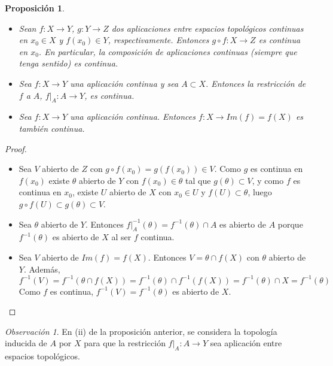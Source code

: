\documentclass[12pt]{report}
\newtheorem{proposition}{Proposición}[chapter]
\theoremstyle{definition}
\theoremstyle{definition}
\theoremstyle{remark}
\newtheorem*{obs}{Observación} %
\begin{document}
\begin{proposition}
\label{prop1.15.}
\hfill
\begin{itemize}
    \item[(i)] Sean $f \colon X \to Y$, $g \colon Y \to Z$ dos aplicaciones entre espacios topológicos continuas en $x_0 \in X$ y $f(x_0) \in Y$, respectivamente. Entonces $g \circ f \colon X \to Z$ es continua en $x_0$. En particular, la composición de aplicaciones continuas (siempre que tenga sentido) es continua.
    \item[(ii)] Sea $f \colon X \to Y$ una aplicación continua y sea $A \subset X$. Entonces la restricción de $f$ a $A$, $\left.f\right|_A \colon A \to Y$, es continua.
    \item[(iii)] Sea $f \colon X \to Y$ una aplicación continua. Entonces $f \colon X \to Im(f) = f(X)$ es también continua.
\end{itemize}
\end{proposition}

\begin{proof}
\hfill
\begin{itemize}
    \item[(i)] Sea $V$ abierto de $Z$ con $g \circ f (x_0) = g(f(x_0)) \in V$. Como $g$ es continua en $f(x_0)$ existe $\theta$ abierto de $Y$ con $f(x_0) \in \theta$ tal que $g(\theta) \subset V$, y como $f$ es continua en $x_0$, existe $U$ abierto de $X$ con $x_0 \in U$ y $f(U) \subset \theta$, luego $g \circ f (U) \subset g(\theta) \subset V$. 
    \item[(ii)] Sea $\theta$ abierto de $Y$. Entonces $\left.f\right|_A^{-1}(\theta) = f^{-1}(\theta) \cap A$ es abierto de $A$ porque $f^{-1}(\theta)$ es abierto de $X$ al ser $f$ continua.
    \item[(iii)] Sea $V$ abierto de $Im(f) = f(X)$. Entonces $V = \theta \cap f(X)$ con $\theta$ abierto de $Y$. Además, \[f^{-1}(V) = f^{-1}(\theta \cap f(X)) = f^{-1}(\theta) \cap f^{-1}(f(X)) = f^{-1}(\theta) \cap X = f^{-1}(\theta)\] Como $f$ es continua, $f^{-1}(V) = f^{-1}(\theta)$ es abierto de $X$.
\end{itemize}
\end{proof}

\begin{obs}
En (ii) de la proposición anterior, se considera la topología inducida de $A$ por $X$ para que la restricción $\left.f\right|_A \colon A \to Y$ sea aplicación entre espacios topológicos.
\end{obs}
\end{document}
